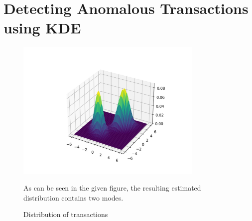 \section{Detecting Anomalous Transactions using KDE}
\begin{figure}[H]
	\centering
	\includegraphics[width=0.8\textwidth]{transaction_distribution.jpg}
	\caption{Distribution of transactions}

	As can be seen in the given figure, the resulting estimated
	distribution contains two modes.
\end{figure}
